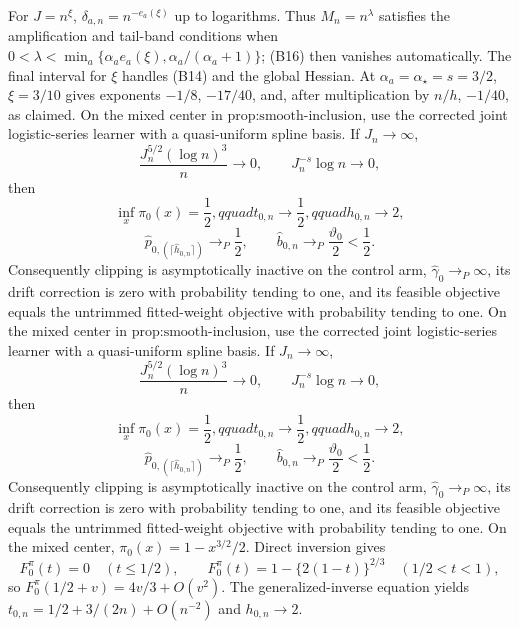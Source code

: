 For \(J=n^\xi\), \(\delta_{a,n}=n^{-e_a(\xi)}\) up to logarithms.  Thus \(M_n=n^\lambda\) satisfies the amplification and tail-band conditions when \(0<\lambda<\min_a\{\alpha_ae_a(\xi),\alpha_a/(\alpha_a+1)\}\); (B16) then vanishes automatically.  The final interval for \(\xi\) handles (B14) and the global Hessian.  At \(\alpha_a=\alpha_\star=s=3/2\), \(\xi=3/10\) gives exponents \(-1/8\), \(-17/40\), and, after multiplication by \(n/h\), \(-1/40\), as claimed.
On the mixed center in \(\text{prop:smooth-inclusion}\), use the corrected joint logistic-series learner with a quasi-uniform spline basis.  If \(J_n\to\infty\),
\[
 \frac{J_n^{5/2}(\log n)^3}{n}\to0,
 \qquad J_n^{-s}\log n\to0,
\]
then
\[
 \inf_x\pi_0(x)=\frac12,qquad t_{0,n}\to\frac12,qquad h_{0,n}\to2,
\]
\[
 \widehat p_{0,(\lceil\widehat h_{0,n}\rceil)}\to_P\frac12,
 \qquad \widehat b_{0,n}\to_P\frac{\vartheta_0}{2}<\frac12.
\]
Consequently clipping is asymptotically inactive on the control arm, \(\widehat\gamma_0\to_P\infty\), its drift correction is zero with probability tending to one, and its feasible objective equals the untrimmed fitted-weight objective with probability tending to one.
On the mixed center in \(\text{prop:smooth-inclusion}\), use the corrected joint logistic-series learner with a quasi-uniform spline basis.  If \(J_n\to\infty\),
\[
 \frac{J_n^{5/2}(\log n)^3}{n}\to0,
 \qquad J_n^{-s}\log n\to0,
\]
then
\[
 \inf_x\pi_0(x)=\frac12,qquad t_{0,n}\to\frac12,qquad h_{0,n}\to2,
\]
\[
 \widehat p_{0,(\lceil\widehat h_{0,n}\rceil)}\to_P\frac12,
 \qquad \widehat b_{0,n}\to_P\frac{\vartheta_0}{2}<\frac12.
\]
Consequently clipping is asymptotically inactive on the control arm, \(\widehat\gamma_0\to_P\infty\), its drift correction is zero with probability tending to one, and its feasible objective equals the untrimmed fitted-weight objective with probability tending to one.
On the mixed center, \(\pi_0(x)=1-x^{3/2}/2\).  Direct inversion gives
\[
 F_0^\pi(t)=0\quad(t\le1/2),
 \qquad
 F_0^\pi(t)=1-\{2(1-t)\}^{2/3}\quad(1/2<t<1),
\]
so \(F_0^\pi(1/2+v)=4v/3+O(v^2)\).  The generalized-inverse equation yields \(t_{0,n}=1/2+3/(2n)+O(n^{-2})\) and \(h_{0,n}\to2\).

